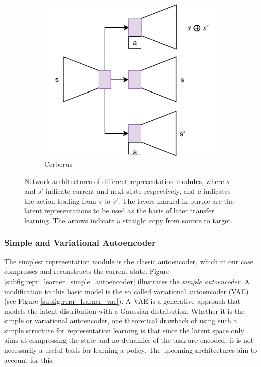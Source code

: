 \begin{figure}[ht!]
\begin{subfigure}{0.5\columnwidth}
		\centering
		\includegraphics[width=\linewidth]{img/cerberus.pdf}
		\caption{Cerberus}
		\label{subfig:repr_learner_cerberus}
	\end{subfigure}
	\caption{Network architectures of different representation modules, where $s$ and $s'$ indicate current and next state respectively, and $a$ indicates the action leading from $s$ to $s'$. 
	The layers marked in purple are the latent representations to be used as the basis of later transfer learning. 
	The arrows indicate a straight copy from source to target.
	}
	\label{fig:repr_learner}
\end{figure}

\subsubsection{Simple and Variational Autoencoder}
The simplest representation module is the classic autoencoder, which in our case compresses and reconstructs the current state. Figure \ref{subfig:repr_learner_simple_autoencoder} illustrates the \textit{simple autoencoder}.  A modification to this basic model is the so called variational autoencoder (VAE) (see Figure \ref{subfig:repr_learner_vae}). A VAE is a generative approach that models the latent distribution with a Gaussian distribution. Whether it is the simple or variational autoencoder, one theoretical drawback of using such a simple structure for representation learning is that since the latent space only aims at compressing the state and no dynamics of the task are encoded, it is not necessarily a useful basis for learning a policy. The upcoming architectures aim to account for this.

